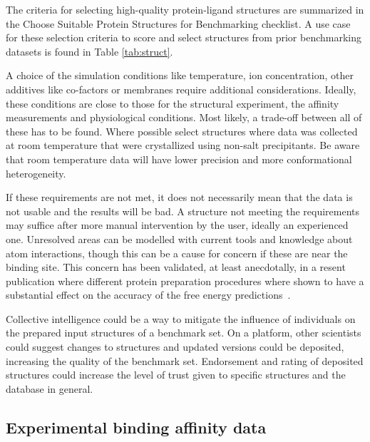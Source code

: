 \documentclass[9pt,bestpractices]{livecoms}
\begin{document}
The criteria for selecting high-quality protein-ligand structures are summarized in the Choose Suitable Protein Structures for Benchmarking checklist. A use case for these selection criteria to score and select structures from prior benchmarking datasets is found in Table \ref{tab:struct}.

A choice of the simulation conditions like temperature, ion concentration, other additives like co-factors or membranes require additional considerations. Ideally, these conditions are close to those for the structural experiment, the affinity measurements and physiological conditions. Most likely, a trade-off between all of these has to be found. Where possible select structures where data was collected at room temperature that were crystallized using non-salt precipitants. Be aware that room temperature data will have lower precision and more conformational heterogeneity.
    
%
If these requirements are not met, it does not necessarily mean that the data is not usable and the results will be bad. A structure not meeting the requirements may suffice after more manual intervention by the user, ideally an experienced one. Unresolved areas can be modelled with current tools and knowledge about atom interactions, though this can be a cause for concern if these are near the binding site. This concern has been validated, at least anecdotally, in a resent publication where different protein preparation procedures where shown to have a substantial effect on the accuracy of the free energy predictions~\cite{shih_impact_2020}.


Collective intelligence could be a way to mitigate the influence of individuals on the prepared input structures of a benchmark set. On a platform, other scientists could suggest changes to structures and updated versions could be deposited, increasing the quality of the benchmark set. Endorsement and rating of deposited structures could increase the level of trust given to specific structures and the database in general.


\subsection{Experimental binding affinity data}
\label{sec:affinities}
\end{document}
